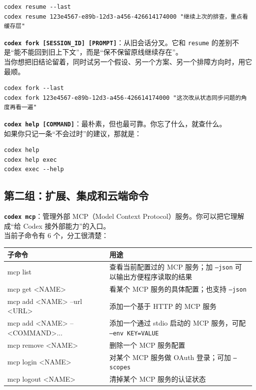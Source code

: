 \documentclass[UTF8,a4paper,12pt]{ctexart}
\begin{document}
\begin{lstlisting}[style=cli]
codex resume --last
codex resume 123e4567-e89b-12d3-a456-426614174000 "继续上次的排查，重点看缓存层"
\end{lstlisting}

\medskip
\textbf{\texttt{codex fork [SESSION\_ID] [PROMPT]}}：从旧会话分叉。它和 \texttt{resume} 的差别不是“能不能回到旧上下文”，而是“保不保留原线继续存在”。\\
当你想把旧结论留着，同时试另一个假设、另一个方案、另一个排障方向时，用它最顺。

\begin{lstlisting}[style=cli]
codex fork --last
codex fork 123e4567-e89b-12d3-a456-426614174000 "这次改从状态同步问题的角度再看一遍"
\end{lstlisting}

\medskip
\textbf{\texttt{codex help [COMMAND]}}：最朴素，但也最可靠。你忘了什么，就查什么。\\
如果你只记一条“不会过时”的建议，那就是：

\begin{lstlisting}[style=cli]
codex help
codex help exec
codex exec --help
\end{lstlisting}

\subsection{第二组：扩展、集成和云端命令}

\textbf{\texttt{codex mcp}}：管理外部 MCP（Model Context Protocol）服务。你可以把它理解成“给 Codex 接外部能力”的入口。\\
当前子命令有 6 个，分工很清楚：

\begin{longtable}{>{\ttfamily\raggedright\arraybackslash}p{} >{\raggedright\arraybackslash}p{}}
\toprule
子命令 & 用途 \\
\midrule
\endhead
mcp list & 查看当前配置过的 MCP 服务；加 \texttt{--json} 可以输出方便程序读取的结果 \\
mcp get <NAME> & 看某个 MCP 服务的具体配置；也支持 \texttt{--json} \\
mcp add <NAME> --url <URL> & 添加一个基于 HTTP 的 MCP 服务 \\
mcp add <NAME> -- <COMMAND>... & 添加一个通过 stdio 启动的 MCP 服务，可配 \texttt{--env KEY=VALUE} \\
mcp remove <NAME> & 删除一个 MCP 服务配置 \\
mcp login <NAME> & 对某个 MCP 服务做 OAuth 登录；可加 \texttt{--scopes} \\
mcp logout <NAME> & 清掉某个 MCP 服务的认证状态 \\
\bottomrule
\end{longtable}
\end{document}
